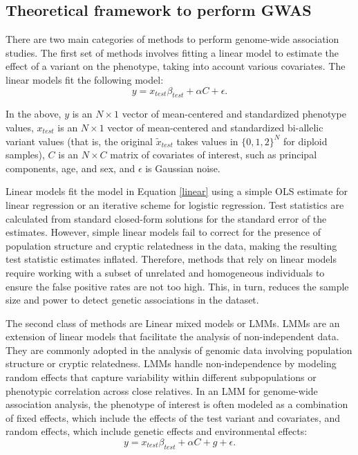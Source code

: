 \subsection{Theoretical framework to perform GWAS}
\label{sec:ch1-lmm}
There are two main categories of methods to perform genome-wide association studies. The first set of methods involves fitting a linear model to estimate the effect of a variant on the phenotype, taking into account various covariates. The linear models fit the following model:
\begin{equation}
    y = x_{test}\beta_{test} + \alpha C + \epsilon. \label{linear}
\end{equation}

In the above, \(y\) is an \(N \times 1\) vector of mean-centered and standardized phenotype values, \(x_{test}\) is an \(N \times 1\) vector of mean-centered and standardized bi-allelic variant values (that is, the original \(\tilde{x}_{test}\) takes values in \(\{0,1,2\}^N\) for diploid samples), \(C\) is an \(N \times C\) matrix of covariates of interest, such as principal components, age, and sex, and \(\epsilon\) is Gaussian noise.

Linear models fit the model in Equation \ref{linear} using a simple OLS estimate for linear regression or an iterative scheme for logistic regression. Test statistics are calculated from standard closed-form solutions for the standard error of the estimates. However, simple linear models fail to correct for the presence of population structure and cryptic relatedness in the data, making the resulting test statistic estimates inflated. Therefore, methods that rely on linear models require working with a subset of unrelated and homogeneous individuals to ensure the false positive rates are not too high. This, in turn, reduces the sample size and power to detect genetic associations in the dataset.

The second class of methods are Linear mixed models or LMMs. LMMs are an extension of linear models that facilitate the analysis of non-independent data. They are commonly adopted in the analysis of genomic data involving population structure or cryptic relatedness. LMMs handle non-independence by modeling random effects that capture variability within different subpopulations or phenotypic correlation across close relatives. In an LMM for genome-wide association analysis, the phenotype of interest is often modeled as a combination of fixed effects, which include the effects of the test variant and covariates, and random effects, which include genetic effects and environmental effects:
\begin{equation}
    y = x_{test}\beta_{test} + \alpha C + g + \epsilon \label{lmm}.
\end{equation}

